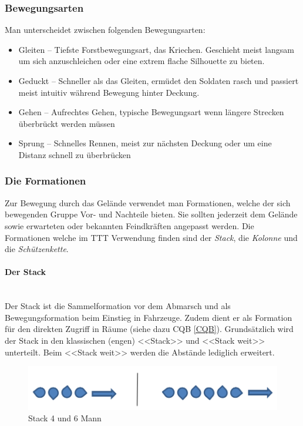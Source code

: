 \subsubsection{Bewegungsarten}

Man unterscheidet zwischen folgenden Bewegungsarten:
	\begin{itemize}
		\item Gleiten -- Tiefste Forstbewegungsart, das Kriechen. Geschieht meist langsam um sich anzuschleichen oder eine extrem flache Silhouette zu bieten.
		\item Geduckt -- Schneller als das Gleiten, ermüdet den Soldaten rasch und passiert meist intuitiv während Bewegung hinter Deckung.
		\item Gehen -- Aufrechtes Gehen, typische Bewegungsart wenn längere Strecken überbrückt werden müssen
		\item Sprung -- Schnelles Rennen, meist zur nächsten Deckung oder um eine Distanz schnell zu überbrücken
	\end{itemize}

\subsubsection{Die Formationen}

	Zur Bewegung durch das Gelände verwendet man Formationen, welche der sich bewegenden Gruppe Vor- und Nachteile bieten. Sie sollten jederzeit dem Gelände sowie erwarteten oder bekannten Feindkräften angepasst werden. Die Formationen welche im TTT Verwendung finden sind der \textit{Stack}, die \textit{Kolonne} und die \textit{Schützenkette}. 

\paragraph{Der Stack}$\ $\\

	Der Stack ist die Sammelformation vor dem Abmarsch und als Bewegungsformation beim Einstieg in Fahrzeuge. Zudem dient er als Formation für den direkten Zugriff in Räume (siehe dazu CQB \autoref{CQB}). Grundsätzlich wird der Stack in den klassischen (engen) <<Stack>> und <<Stack weit>> unterteilt. Beim <<Stack weit>> werden die Abstände lediglich erweitert.\\
	\begin{figure}[!htb]
		\centering
		\includegraphics[width=15cm]{./Grafiken/Abschnitt/Stack.png}
		\caption{Stack 4 und 6 Mann}
	\end{figure}

